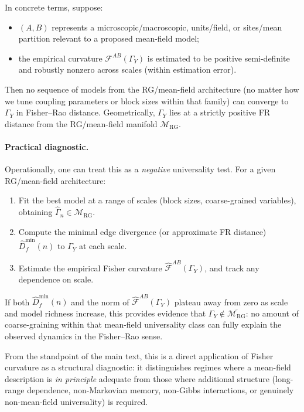 \documentclass[11pt]{article}
\newcommand{\1}{\mathbf{1}}
\begin{document}
In concrete terms, suppose:
\begin{itemize}[leftmargin=1.6em]
  \item $(A,B)$ represents a microscopic/macroscopic, units/field, or
        sites/mean partition relevant to a proposed mean-field model;
  \item the empirical curvature $\mathcal F^{AB}(\Gamma_Y)$
        is estimated to be positive semi-definite and robustly nonzero
        across scales (within estimation error).
\end{itemize}
Then no sequence of models from the RG/mean-field architecture (no matter how we tune coupling parameters or block sizes within that family) can converge to $\Gamma_Y$ in Fisher--Rao distance. Geometrically, $\Gamma_Y$ lies at a strictly positive FR distance from the RG/mean-field manifold
$\mathcal M_{\mathrm{RG}}$.

\paragraph{Practical diagnostic.}
Operationally, one can treat this as a \emph{negative} universality
test. For a given RG/mean-field architecture:
\begin{enumerate}[leftmargin=1.6em]
  \item Fit the best model at a range of scales (block sizes, coarse-grained
        variables), obtaining $\widehat\Gamma_n \in \mathcal M_{\mathrm{RG}}$.
  \item Compute the minimal edge divergence (or approximate FR distance)
        $\widehat D_f^{\min}(n)$ to $\Gamma_Y$ at each scale.
  \item Estimate the empirical Fisher curvature
        $\widehat{\mathcal F}^{AB}(\Gamma_Y)$, and track any
        dependence on scale.
\end{enumerate}
If both $\widehat D_f^{\min}(n)$ and the norm of $\widehat{\mathcal F}^{AB}(\Gamma_Y)$ plateau away from zero as scale and model richness increase, this provides evidence that $\Gamma_Y \notin \overline{\mathcal M_{\mathrm{RG}}}$: no amount of coarse-graining within that mean-field universality class can fully explain the observed dynamics in the Fisher--Rao sense.

From the standpoint of the main text, this is a direct application of Fisher curvature as a structural diagnostic: it distinguishes regimes where a mean-field description is \emph{in principle} adequate from those where additional structure (long-range dependence, non-Markovian memory, non-Gibbs interactions, or genuinely non-mean-field universality) is required.
\end{document}
